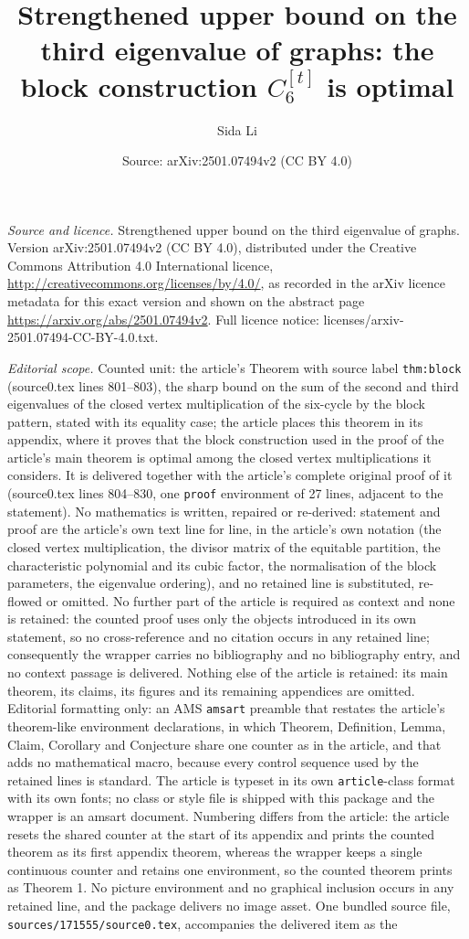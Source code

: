\documentclass[10pt,a4paper]{amsart}
\title[Third eigenvalue of graphs]{Strengthened upper bound on the third eigenvalue of graphs: the block construction $C_6^{[t]}$ is optimal}
\author{Sida Li}
\date{Source: arXiv:2501.07494v2 (CC BY 4.0)}
\theoremstyle{plain}
\begin{document}
\maketitle
\noindent\emph{Source and licence.} Strengthened upper bound on the third eigenvalue of graphs. Version arXiv:2501.07494v2 (CC BY 4.0), distributed under the Creative Commons Attribution 4.0 International licence, \url{http://creativecommons.org/licenses/by/4.0/}, as recorded in the arXiv licence metadata for this exact version and shown on the abstract page \url{https://arxiv.org/abs/2501.07494v2}. Full licence notice: licenses/arxiv-2501.07494-CC-BY-4.0.txt.\par\smallskip

\noindent\textit{Editorial scope.} Counted unit: the article's Theorem with source label \texttt{thm:block} (source0.tex lines 801--803), the sharp bound on the sum of the second and third eigenvalues of the closed vertex multiplication of the six-cycle by the block pattern, stated with its equality case; the article places this theorem in its appendix, where it proves that the block construction used in the proof of the article's main theorem is optimal among the closed vertex multiplications it considers. It is delivered together with the article's complete original proof of it (source0.tex lines 804--830, one \texttt{proof} environment of 27 lines, adjacent to the statement). No mathematics is written, repaired or re-derived: statement and proof are the article's own text line for line, in the article's own notation (the closed vertex multiplication, the divisor matrix of the equitable partition, the characteristic polynomial and its cubic factor, the normalisation of the block parameters, the eigenvalue ordering), and no retained line is substituted, re-flowed or omitted. No further part of the article is required as context and none is retained: the counted proof uses only the objects introduced in its own statement, so no cross-reference and no citation occurs in any retained line; consequently the wrapper carries no bibliography and no bibliography entry, and no context passage is delivered. Nothing else of the article is retained: its main theorem, its claims, its figures and its remaining appendices are omitted. Editorial formatting only: an AMS \texttt{amsart} preamble that restates the article's theorem-like environment declarations, in which Theorem, Definition, Lemma, Claim, Corollary and Conjecture share one counter as in the article, and that adds no mathematical macro, because every control sequence used by the retained lines is standard. The article is typeset in its own \texttt{article}-class format with its own fonts; no class or style file is shipped with this package and the wrapper is an amsart document. Numbering differs from the article: the article resets the shared counter at the start of its appendix and prints the counted theorem as its first appendix theorem, whereas the wrapper keeps a single continuous counter and retains one environment, so the counted theorem prints as Theorem 1. No picture environment and no graphical inclusion occurs in any retained line, and the package delivers no image asset. One bundled source file, \texttt{sources/171555/source0.tex}, accompanies the delivered item as the 
\end{document}
